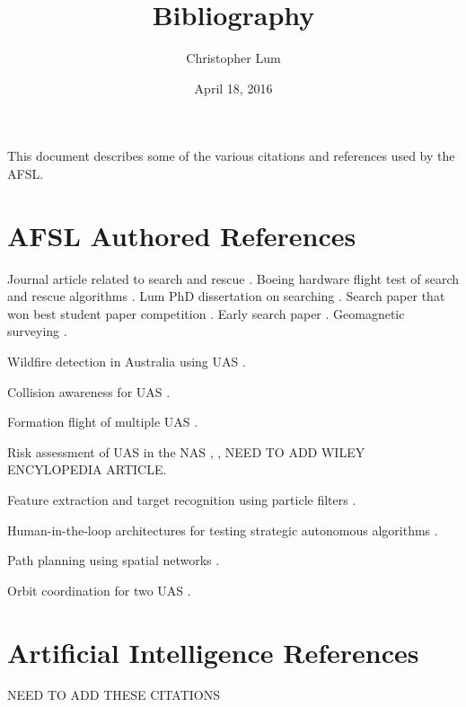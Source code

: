 \documentclass[12pt]{article}
\title{Bibliography}
\author{Christopher Lum}
\date{April 18, 2016}
\begin{document}
\maketitle

This document describes some of the various citations and references used by the AFSL.

\section{AFSL Authored References}

Journal article related to search and rescue \cite{Lum_Searching_JACIC_2010}.  Boeing hardware flight test of search and rescue algorithms \cite{Lum_Partitioned_Searching_Boeing_2010}.  Lum PhD dissertation on searching \cite{Lum_phD_Thesis_2009}.  Search paper that won best student paper competition \cite{Lum_Modular_Search_Algorithm_2009}.  Early search paper \cite{Lum_Optimizing_Search_2006}.  Geomagnetic surveying \cite{Lum_Geomagnetic_Surveying_2005}.

Wildfire detection in Australia using UAS \cite{Lum_Wildfire_2015}.

Collision awareness for UAS \cite{Ueunten_Conservative_Collision_Awareness_2015}.

Formation flight of multiple UAS \cite{Lum_Formation_Flight_2012}.

Risk assessment of UAS in the NAS \cite{Lum_UAS_Over_Populated_Areas_2011}, \cite{Lum_Risk_for_UAVs_2010}, NEED TO ADD WILEY ENCYLOPEDIA ARTICLE.

Feature extraction and target recognition using particle filters \cite{Lum_Feature_Extraction_2008}.

Human-in-the-loop architectures for testing strategic autonomous algorithms \cite{Lum_Path_UAV_Pilot_Interface_2008}.

Path planning using spatial networks \cite{Lum_Path_Planning_Networks_2007}.

Orbit coordination for two UAS \cite{Rysdyk_Orbit_Coordination_2005}.

\section{Artificial Intelligence References}

NEED TO ADD THESE CITATIONS



\end{document}
